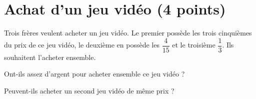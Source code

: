 \section{Achat d'un jeu vidéo (4 points)}

Trois frères veulent acheter un jeu vidéo. Le premier possède les trois cinquièmes du prix de ce jeu vidéo, le deuxième en possède les $\dfrac{4}{15}$ et le troisième $\dfrac{1}{3}$. Ils souhaitent l'acheter ensemble.

\begin{questions}
	\question[2] Ont-ils assez d'argent pour acheter ensemble ce jeu vidéo ?
	
	\question[2] Peuvent-ils acheter un second jeu vidéo de même prix ?
\end{questions}


